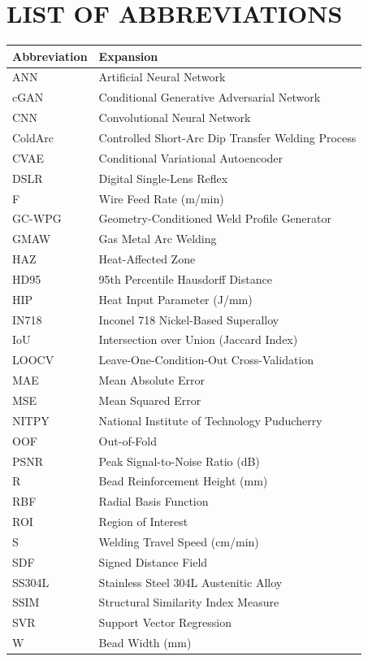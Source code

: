 \documentclass[12pt,a4paper,oneside]{report}
\begin{document}
\chapter*{\centering LIST OF ABBREVIATIONS}
\vspace{6mm}
\begin{center}
\renewcommand{\arraystretch}{1.2}
\begin{tabular}{@{}p{}p{}@{}}
\toprule
\textbf{Abbreviation} & \textbf{Expansion}\\ \midrule
ANN     & Artificial Neural Network\\
cGAN    & Conditional Generative Adversarial Network\\
CNN     & Convolutional Neural Network\\
ColdArc & Controlled Short-Arc Dip Transfer Welding Process\\
CVAE    & Conditional Variational Autoencoder\\
DSLR    & Digital Single-Lens Reflex\\
F       & Wire Feed Rate (m/min)\\
GC-WPG  & Geometry-Conditioned Weld Profile Generator\\
GMAW    & Gas Metal Arc Welding\\
HAZ     & Heat-Affected Zone\\
HD95    & 95th Percentile Hausdorff Distance\\
HIP     & Heat Input Parameter (J/mm)\\
IN718   & Inconel 718 Nickel-Based Superalloy\\
IoU     & Intersection over Union (Jaccard Index)\\
LOOCV   & Leave-One-Condition-Out Cross-Validation\\
MAE     & Mean Absolute Error\\
MSE     & Mean Squared Error\\
NITPY   & National Institute of Technology Puducherry\\
OOF     & Out-of-Fold\\
PSNR    & Peak Signal-to-Noise Ratio (dB)\\
R       & Bead Reinforcement Height (mm)\\
RBF     & Radial Basis Function\\
ROI     & Region of Interest\\
S       & Welding Travel Speed (cm/min)\\
SDF     & Signed Distance Field\\
SS304L  & Stainless Steel 304L Austenitic Alloy\\
SSIM    & Structural Similarity Index Measure\\
SVR     & Support Vector Regression\\
W       & Bead Width (mm)\\
\bottomrule
\end{tabular}
\end{center}
\clearpage
\end{document}
